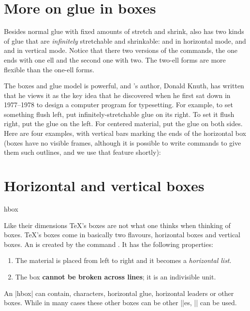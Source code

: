 \section{More on glue in boxes}

Besides normal glue with fixed amounts of stretch and shrink, \tex also has
two kinds of glue that are \emph{infinitely} stretchable and shrinkable:  and
 in horizontal mode, and  and  in vertical mode. Notice that there two versions
of the commands, the one ends with one ell and the second one with two. The
two-ell forms are more flexible than the one-ell forms.

The boxes and glue model is powerful, and \tex's author, Donald Knuth,
has written that he views it as the key idea that he discovered when he
first sat down in 1977--1978 to design a computer program for typesetting.
For example, to set something flush left, put infinitely-stretchable glue on
its right. To set it flush right, put the glue on the left. For centered material,
put the glue on both sides. Here are four examples, with vertical
bars marking the ends of the horizontal box (boxes have no visible frames,
although it is possible to write \tex commands to give them such outlines,
and we use that feature shortly):





\section{Horizontal and vertical boxes}


\begin{docCommand}{hbox}{}
\end{docCommand}

Like their dimensions \TeX's boxes are not what one thinks when thinking of boxes. TeX's boxes come in basically two flavours, horizontal boxes and vertical boxes. An  is created by the command . It has the following properties:

\begin{enumerate}
\item The material is placed from left to right and it becomes a \textit{horizontal list}.
\item The box \textbf{cannot be broken across lines}; it is an indivisible unit.
\end{enumerate}

An |hbox| can contain, characters, horizontal glue, horizontal leaders or other boxes. While in many cases these other boxes can be other |\hbox|es, |\vbox| can be used.


